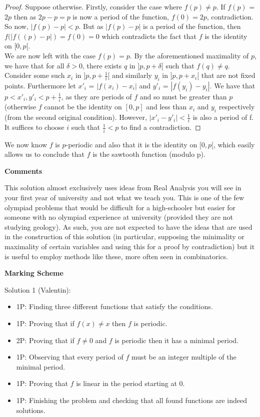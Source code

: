 \begin{proof}
Suppose otherwise. Firstly, consider the case where $f(p) \neq p$. If $f(p)$ = $2p$ then as $2p - p = p$ is now a period of the function, $f(0) = 2p$, contradiction. So now, $|f(p)-p| < p$. But as $|f(p)-p|$ is a period of the function, then $f(|f((p)-p|) = f(0) = 0$ which contradicts the fact that $f$ is the identity on $[0,p[$. \\
We are now left with the case $f(p) = p$. By the aforementioned maximality of $p$, we have that for all $\delta > 0$, there exists $q$ in $]p,p+\delta[$ such that $f(q) \neq q$. \\
Consider some such $x_i$ in $]p, p+\frac{1}{i}[$ and similarly $y_i$ in $]p, p+x_i[$ that are not fixed points. Furthermore let $x'_i$ = $|f(x_i)-x_i|$ and $y'_i$ = $|f(y_i)-y_i|$. We have that $p < x'_i, y'_i < p+\frac{1}{i}$, as they are periods of $f$ and so must be greater than $p$ (otherwise $f$ cannot be the identity on $[0, p]$ and less than $x_i$ and $y_i$ respectively (from the second original condition). However, $|x'_i - y'_i| < \frac{1}{i}$ is  also a period of f. It suffices to choose $i$ such that $\frac{1}{i} < p$ to find a contradiction. 
\end{proof}
We now know $f$ is $p$-periodic and also that it is the identity on $[0,p[$, which easily allows us to conclude that $f$ is the sawtooth function (modulo p). 

\textbf{Comments}

This solution almost exclusively uses ideas from Real Analysis you will see in your first year of university and not what we teach you. This is one of the few olympiad problems that would be difficult for a high-schooler but easier for someone with no olympiad experience at university (provided they are not studying geology). As such, you are not expected to have the ideas that are used in the construction of this solution (in particular, supposing the minimality or maximality of certain variables and using this for a proof by contradiction) but it is useful to employ methods like these, more often seen in combinatorics.\\

\newpage

\textbf{Marking Scheme}

Solution 1 (Valentin):
\begin{itemize}
\item 1P: Finding three different functions that satisfy the conditions.
\item 1P: Proving that if $f(x)\neq x$ then $f$ is periodic.
\item 2P: Proving that if $f\neq 0$ and $f$ is periodic then it has a minimal period.
\item 1P: Observing that every period of $f$ must be an integer multiple of the minimal period.
\item 1P: Proving that $f$ is linear in the period starting at $0$.
\item 1P: Finishing the problem and checking that all found functions are indeed solutions.
\end{itemize}

